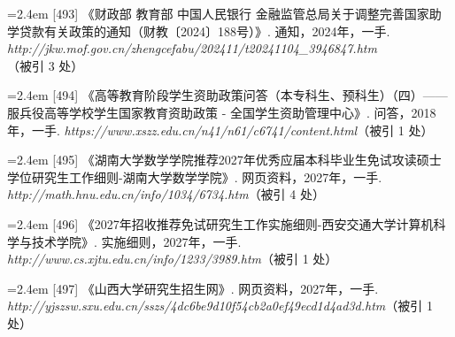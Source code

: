 {\vspace{0.6pt}
\vspace{3.5pt}\par
\nopagebreak\vspace{1pt}
\noindent\hangindent=2.4em \label{src:S0656}{\color{cAccent}[493]} 《财政部 教育部 中国人民银行 金融监管总局关于调整完善国家助学贷款有关政策的通知（财教〔2024〕188号）》. 通知，2024年，一手. \textit{http://jkw.mof.gov.cn/zhengcefabu/202411/t20241104\_3946847.htm}（被引 3 处）\par
\vspace{0.6pt}
\vspace{3.5pt}\par
\nopagebreak\vspace{1pt}
\noindent\hangindent=2.4em \label{src:S0658}{\color{cAccent}[494]} 《高等教育阶段学生资助政策问答（本专科生、预科生）（四）——服兵役高等学校学生国家教育资助政策 - 全国学生资助管理中心》. 问答，2018年，一手. \textit{https://www.xszz.edu.cn/n41/n61/c6741/content.html}（被引 1 处）\par
\vspace{0.6pt}
\vspace{3.5pt}\par
\nopagebreak\vspace{1pt}
\noindent\hangindent=2.4em \label{src:S0661}{\color{cAccent}[495]} 《湖南大学数学学院推荐2027年优秀应届本科毕业生免试攻读硕士学位研究生工作细则-湖南大学数学学院》. 网页资料，2027年，一手. \textit{http://math.hnu.edu.cn/info/1034/6734.htm}（被引 4 处）\par
\vspace{0.6pt}
\vspace{3.5pt}\par
\nopagebreak\vspace{1pt}
\noindent\hangindent=2.4em \label{src:S0662}{\color{cAccent}[496]} 《2027年招收推荐免试研究生工作实施细则-西安交通大学计算机科学与技术学院》. 实施细则，2027年，一手. \textit{http://www.cs.xjtu.edu.cn/info/1233/3989.htm}（被引 1 处）\par
\vspace{0.6pt}
\vspace{3.5pt}\par
\nopagebreak\vspace{1pt}
\noindent\hangindent=2.4em \label{src:S0667}{\color{cAccent}[497]} 《山西大学研究生招生网》. 网页资料，2027年，一手. \textit{http://yjszsw.sxu.edu.cn/sszs/4dc6be9d10f54cb2a0ef49ecd1d4ad3d.htm}（被引 1 处）\par
}
